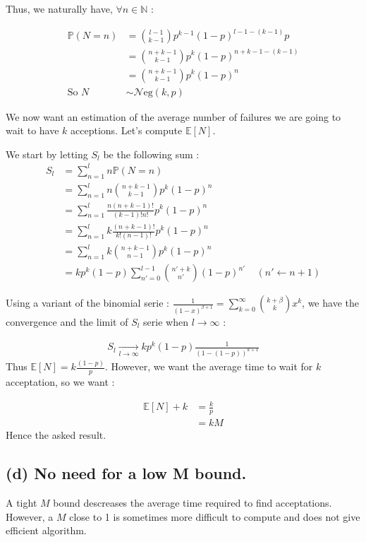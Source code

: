 \documentclass{article}
\newcommand{\N}{\mathbb N}
\begin{document}
Thus, we naturally have, $\forall n \in \N$ : 

\begin{align*}
    \mathbb{P}(N=n) &= {l-1 \choose k-1} p^{k-1} (1-p)^{l-1-(k-1)} p \\
                    &= {n+k-1 \choose k-1}p^{k} (1-p)^{n+k-1-(k-1)} \\
                    &= {n+k-1 \choose k-1}p^{k} (1-p)^{n} \\
        \text{So } N &\sim \mathcal{N}\text{eg}( k,p )
\end{align*}



We now want an estimation of the average number of failures we are going to wait
to have $k$ acceptions. Let's compute $\mathbb{E}[N]$. 

We start by letting $S_l$ be the following sum :
\begin{align*}
    S_l &= \sum_{n=1}^{l} n \mathbb{P}(N=n) \\
        &= \sum_{n=1}^{l} n {n+k-1 \choose k-1}p^{k} (1-p)^{n} \\
        &= \sum_{n=1}^{l}   \frac{n (n+k-1)!}{(k-1)! n!}   p^{k} (1-p)^{n} \\
        &= \sum_{n=1}^{l} k  \frac{(n+k-1)!}{k! (n-1)!} p^{k} (1-p)^{n} \\
        &= \sum_{n=1}^{l} k {n+k-1 \choose n-1} p^{k} (1-p)^{n} \\
        &= k p^k (1-p) \sum_{n'=0}^{l-1}  {n'+k \choose n'}  (1-p)^{n'}  \ \ \ \ \ (n'\leftarrow n+1)  
\end{align*}


Using a variant of the binomial serie :
$\frac{1}{(1-x)^{\beta+1}} = \sum_{k=0}^{\infty} {k+\beta\choose k} x^k$, we
have the convergence and the limit of $S_l$ serie when $l\rightarrow \infty$ :

\begin{align*}
    S_l \underset{l \rightarrow \infty}{\longrightarrow}
    kp^k (1-p) \frac{1}{(1- (1-p))^{k+1}}
\end{align*}
Thus $\mathbb{E}[N] =k \frac{(1-p)}{p} $. However, we want the average time to wait 
for $k$ acceptation, so we want : 

\begin{align*}
    \mathbb{E}[N] + k &= \frac{k}{p} \\
                      &= kM 
\end{align*}
Hence the asked result.

\subsection*{(d) No need for a low M bound.}
A tight $M$ bound descreases the average time required to find acceptations. 
However, a $M$ close to 1 is sometimes more difficult to compute and does not give
efficient algorithm.
\end{document}
